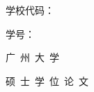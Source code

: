 \vspace*{\dimexpr 0.25cm\relax}

\noindent\begin{minipage}[t]{0.48\textwidth}
  \raggedright
  {\selectfont 学校代码：%
    \underline{}}%
\end{minipage}\hfill
\begin{minipage}[t]{0.48\textwidth}
  \raggedleft
  {\selectfont 学\hspace{4\ccwd}号：%
    \underline{}}%
\end{minipage}

\vspace*{\gzuCoverSkipAfterHead}

\begin{center}
{\heiti{}\selectfont 广\ 州\ 大\ 学\par}
\vspace{\gzuCoverSkipTitlePair}
{\heiti{}\selectfont 硕\ 士\ 学\ 位\ 论\ 文\par}
\end{center}

\vspace{\gzuCoverSkipTitleBlock}

\begin{center}
\begin{minipage}[t]{\gzuCoverBlkW}
  \setlength{\parindent}{0pt}%
  \noindent
  \heiti{}\selectfont
  \underline{\makebox[\gzuCoverTitleLineW][l]{\gzuThesisTitleCN}}\par
  {\heiti{}\selectfont\vspace{1.5\baselineskip}}%
  \noindent
  \makebox[\gzuCoverTitleTagW][l]{}%
  \heiti{}\selectfont
  \underline{\makebox[\gzuCoverTitleLineW]{}}
\end{minipage}
\end{center}

\vspace{\gzuCoverSkipModule}

